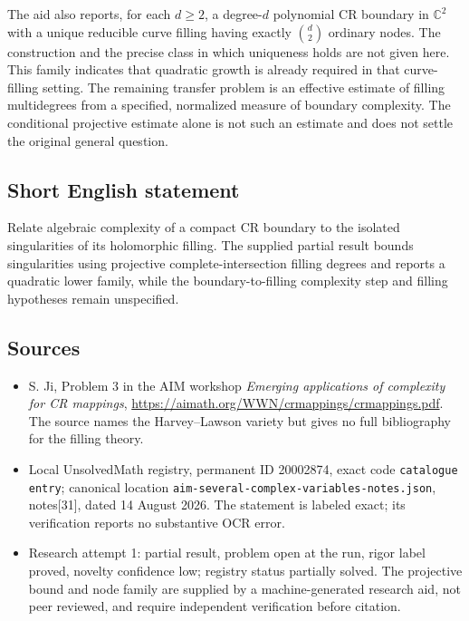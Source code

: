 \documentclass[11pt]{article}
\newcommand{\C}{\mathbb{C}}
\begin{document}
The aid also reports, for each \(d\ge2\), a degree-\(d\) polynomial CR boundary in \(\C^2\) with a unique reducible curve filling having exactly \(\binom d2\) ordinary nodes. The construction and the precise class in which uniqueness holds are not given here. This family indicates that quadratic growth is already required in that curve-filling setting. The remaining transfer problem is an effective estimate of filling multidegrees from a specified, normalized measure of boundary complexity. The conditional projective estimate alone is not such an estimate and does not settle the original general question.
\subsection{Short English statement}
Relate algebraic complexity of a compact CR boundary to the isolated singularities of its holomorphic filling. The supplied partial result bounds singularities using projective complete-intersection filling degrees and reports a quadratic lower family, while the boundary-to-filling complexity step and filling hypotheses remain unspecified.
\subsection{Sources}
\begin{itemize}
\item S. Ji, Problem 3 in the AIM workshop \emph{Emerging applications of complexity for CR mappings}, \url{https://aimath.org/WWN/crmappings/crmappings.pdf}. The source names the Harvey--Lawson variety but gives no full bibliography for the filling theory.
\item Local UnsolvedMath registry, permanent ID 20002874, exact code \texttt{catalogue entry}; canonical location \texttt{aim-several-complex-variables-notes.json}, notes[31], dated 14 August 2026. The statement is labeled exact; its verification reports no substantive OCR error.
\item Research attempt 1: partial result, problem open at the run, rigor label proved, novelty confidence low; registry status partially solved. The projective bound and node family are supplied by a machine-generated research aid, not peer reviewed, and require independent verification before citation.
\end{itemize}
\end{document}
